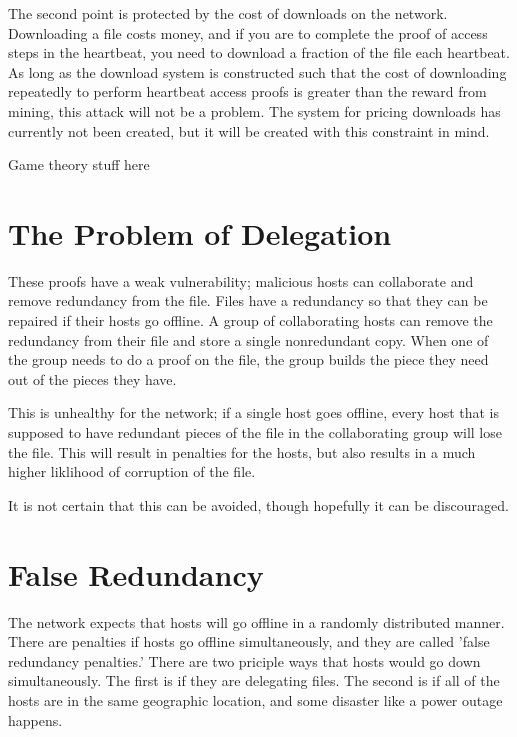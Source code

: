 \documentclass[twocolumn]{article}
\begin{document}
The second point is protected by the cost of downloads on the network.
Downloading a file costs money, and if you are to complete the proof of access steps in the heartbeat, you need to download a fraction of the file each heartbeat.
As long as the download system is constructed such that the cost of downloading repeatedly to perform heartbeat access proofs is greater than the reward from mining, this attack will not be a problem.
The system for pricing downloads has currently not been created, but it will be created with this constraint in mind.

\begin{center}
Game theory stuff here
\end{center}

\section{The Problem of Delegation}

These proofs have a weak vulnerability; malicious hosts can collaborate and remove redundancy from the file.
Files have a redundancy so that they can be repaired if their hosts go offline.
A group of collaborating hosts can remove the redundancy from their file and store a single nonredundant copy.
When one of the group needs to do a proof on the file, the group builds the piece they need out of the pieces they have.

This is unhealthy for the network; if a single host goes offline, every host that is supposed to have redundant pieces of the file in the collaborating group will lose the file.
This will result in penalties for the hosts, but also results in a much higher liklihood of corruption of the file.

It is not certain that this can be avoided, though hopefully it can be discouraged.

\section{False Redundancy}

The network expects that hosts will go offline in a randomly distributed manner.
There are penalties if hosts go offline simultaneously, and they are called 'false redundancy penalties.'
There are two priciple ways that hosts would go down simultaneously.
The first is if they are delegating files.
The second is if all of the hosts are in the same geographic location, and some disaster like a power outage happens.
\end{document}
